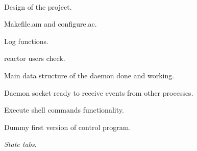 \documentclass[a4paper,11pt]{article}
\begin{document}
\begin{multicols}{2}
\ \\
\begin{list}{-}{January 26th, 2012}
  \item Design of the project.
\end{list}
\begin{list}{-}{February 2nd, 2012}
  \item Makefile.am and configure.ac.
  \item Log functions.
  \item reactor users check.
\end{list}
\begin{list}{-}{February 16th, 2012}
  \item Main data structure of the daemon done and working.
  \item Daemon socket ready to receive events from other processes.
  \item Execute shell commands functionality.
  \item Dummy first version of control program.
\end{list}
\begin{list}{-}{February 29th, 2012}
  \item \emph{State tabs}. %
\end{list}

\end{multicols}
\end{document}
